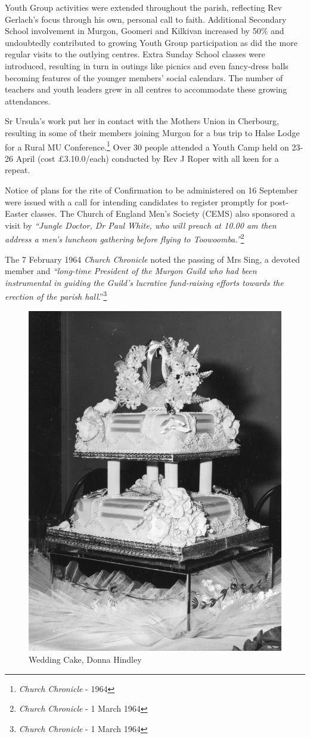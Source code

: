 Youth Group activities were extended throughout the parish, reflecting Rev Gerlach's focus through his own, personal call to faith. Additional Secondary School involvement in Murgon, Goomeri and Kilkivan increased by 50\% and undoubtedly contributed to growing Youth Group participation as did the more regular visits to the outlying centres. Extra Sunday School classes were introduced, resulting in turn in outings like picnics and even fancy-dress balls becoming features of the younger members' social calendars. The number of teachers and youth leaders grew in all centres to accommodate these growing attendances.



Sr Ursula's work put her in contact with the Mothers Union in Cherbourg, resulting in some of their members joining Murgon for a bus trip to Halse Lodge for a Rural MU Conference.\footnote{\emph{Church Chronicle} - 1964} Over 30 people attended a Youth Camp held on 23-26 April (cost \pounds3.10.0/each) conducted by Rev J Roper with all keen for a repeat.


Notice of plans for the rite of Confirmation to be administered on 16 September were issued with a call for intending candidates to register promptly for post-Easter classes. The Church of England Men's Society (CEMS) also sponsored a visit by \emph{``Jungle Doctor, Dr Paul White, who will preach at 10.00 am then address a men's luncheon gathering before flying to Toowoomba.''}\footnote{\emph{Church Chronicle} - 1 March 1964}


The 7 February 1964 \emph{Church Chronicle} noted the passing of Mrs Sing, a devoted member and \emph{``long-time President of the Murgon Guild who had been instrumental in guiding the Guild's lucrative fund-raising efforts towards the erection of the parish hall}.''\footnote{\emph{Church Chronicle} - 1 March 1964}








\begin{figure}
\begin{center}
\includegraphics[width=.5\linewidth,center]{../images/donnaWeddingCake.jpg}
\caption{Wedding Cake, Donna Hindley}
\end{center}
\end{figure}




